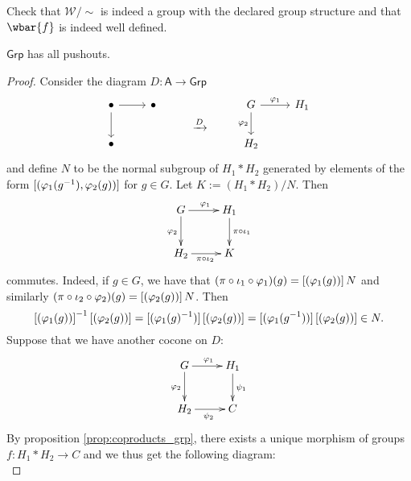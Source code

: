 \begin{exercise}
	Check that $\mathcal{W}/{\sim}$ is indeed a group with the declared group structure and that $\wbar{f}$ is indeed well defined.
\end{exercise}

\begin{proposition}
	\label{prop:pushouts_grp}
	$\mathsf{Grp}$ has all pushouts.
\end{proposition}

\begin{proof}
	Consider the diagram $D : \mathsf{A} \to \mathsf{Grp}$
	\begin{equation*}
		\begin{tikzcd}[row sep=0em]
			\bullet \arrow[r]\arrow[dd] & \bullet & & G \arrow[r,"\varphi_1"]\arrow[dd,"\varphi_2"'] & H_1\\
			& & \xrightarrow{D}\\
			\bullet & & & H_2			
		\end{tikzcd}
	\end{equation*}
	\noindent and define $N$ to be the normal subgroup of $H_1 \ast H_2$ generated by elements of the form $\sbr[0]{(\varphi_1(g^{-1}),\varphi_2(g))}$ for $g \in G$. Let $K := (H_1 \ast H_2)/N$. Then
	\begin{equation*}
		\xymatrix{
			G \ar[r]^{\varphi_1}\ar[d]_{\varphi_2} & H_1 \ar[d]^{\pi \circ \iota_1}\\
			H_2 \ar[r]_{\pi \circ \iota_2} & K
		}
	\end{equation*}
	\noindent commutes. Indeed, if $g \in G$, we have that $(\pi \circ \iota_1 \circ \varphi_1)(g) = \sbr[0]{(\varphi_1(g))}N$ and similarly $(\pi \circ \iota_2 \circ \varphi_2)(g) = \sbr[0]{(\varphi_2(g))}N$. Then 
	\begin{equation*}
		\sbr[0]{(\varphi_1(g))}^{-1}\sbr[0]{(\varphi_2(g))} = \sbr[0]{(\varphi_1(g)^{-1})}\sbr[0]{(\varphi_2(g))} = \sbr[0]{(\varphi_1(g^{-1}))}\sbr[0]{(\varphi_2(g))} \in N.
	\end{equation*}
	Suppose that we have another cocone on $D$:
	\begin{equation*}
		\xymatrix{
			G \ar[r]^{\varphi_1}\ar[d]_{\varphi_2} & H_1 \ar[d]^{\psi_1}\\
			H_2 \ar[r]_{\psi_2} & C
		}
	\end{equation*}
	By proposition \ref{prop:coproducts_grp}, there exists a unique morphism of groups $f : H_1 \ast H_2 \to C$ and we thus get the following diagram:
		\begin{equation*}

\end{equation*}
\end{proof}
